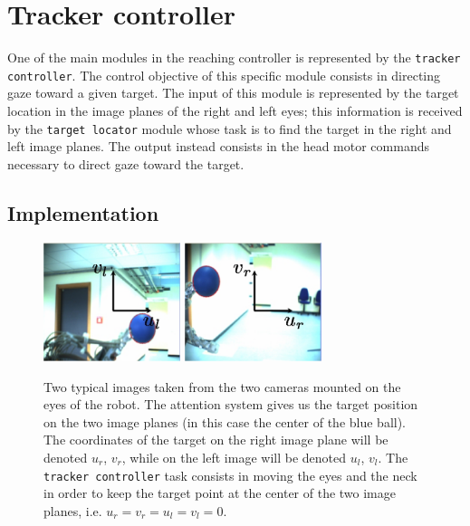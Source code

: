 \section{Tracker controller}
\label{Sec:TrackerController}

One of the main modules in the reaching controller is represented by the {\tt tracker controller}. The control objective of this specific module consists in directing gaze toward a given target. The input of this module is represented by the target location in the image planes of the right and left eyes; this information is received by the {\tt target locator} module whose task is to find the target in the right and left image planes.
The output instead consists in the head motor commands necessary to direct gaze toward the target. 

\subsection{Implementation}

\begin{figure}[tbp]
\centering
\includegraphics[width=40mm]{Figure/LeftImage.eps} \hspace{1cm}
\includegraphics[width=40mm]{Figure/RightImage.eps}
\caption{Two typical images taken from the two cameras mounted on the eyes of the robot. The attention system gives us the target position on the two image planes (in this case the center of the blue ball). The coordinates of the target on the right image plane will be denoted $u_r$, $v_r$, while on the left image will be denoted $u_l$, $v_l$. The {\tt tracker controller} task consists in moving the eyes and the neck in order to keep the target point at the center of the two image planes, i.e. $u_r = v_r = u_l = v_l = 0$.}
\label{Fig:ImagePlane}
\end{figure}
 
